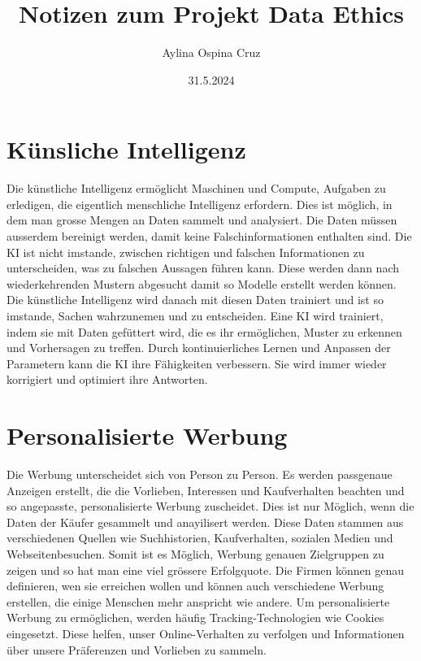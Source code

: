 \documentclass{article}
\title{Notizen zum Projekt Data Ethics}
\author{Aylina Ospina Cruz}
\date{31.5.2024}
\begin{document}
\maketitle


\tableofcontents


\section{Künsliche Intelligenz}

Die künstliche Intelligenz ermöglicht Maschinen und Compute,  Aufgaben zu erledigen, die eigentlich menschliche Intelligenz erfordern. Dies ist möglich, in dem man grosse Mengen an Daten sammelt und analysiert. Die Daten müssen ausserdem bereinigt werden, damit keine Falschinformationen enthalten sind. Die KI ist nicht imstande, zwischen richtigen und falschen Informationen zu unterscheiden, was zu falschen Aussagen führen kann. Diese werden dann nach wiederkehrenden Mustern abgesucht damit so Modelle erstellt werden können. Die künstliche Intelligenz wird danach mit diesen Daten trainiert und ist so imstande, Sachen wahrzunemen und zu entscheiden. Eine KI wird trainiert, indem sie mit Daten gefüttert wird, die es ihr ermöglichen, Muster zu erkennen und Vorhersagen zu treffen. Durch kontinuierliches Lernen und Anpassen der Parametern kann die KI ihre Fähigkeiten verbessern. Sie wird immer wieder korrigiert und optimiert ihre Antworten. 

\section{Personalisierte Werbung}
 Die Werbung unterscheidet sich von Person zu Person. Es werden passgenaue Anzeigen erstellt, die die Vorlieben, Interessen und Kaufverhalten beachten und so angepasste, personalisierte Werbung zuscheidet. Dies ist nur Möglich, wenn die Daten der Käufer gesammelt und anayilisert werden. Diese Daten stammen aus verschiedenen Quellen wie Suchhistorien, Kaufverhalten, sozialen Medien und Webseitenbesuchen. Somit ist es Möglich, Werbung genauen Zielgruppen zu zeigen und so hat man eine viel grössere Erfolgquote. Die Firmen können genau definieren, wen sie erreichen wollen und können auch verschiedene Werbung erstellen, die einige Menschen mehr anspricht wie andere. Um personalisierte Werbung zu ermöglichen, werden häufig Tracking-Technologien wie Cookies eingesetzt. Diese helfen, unser Online-Verhalten zu verfolgen und Informationen über unsere Präferenzen und Vorlieben zu sammeln. 
\end{document}
